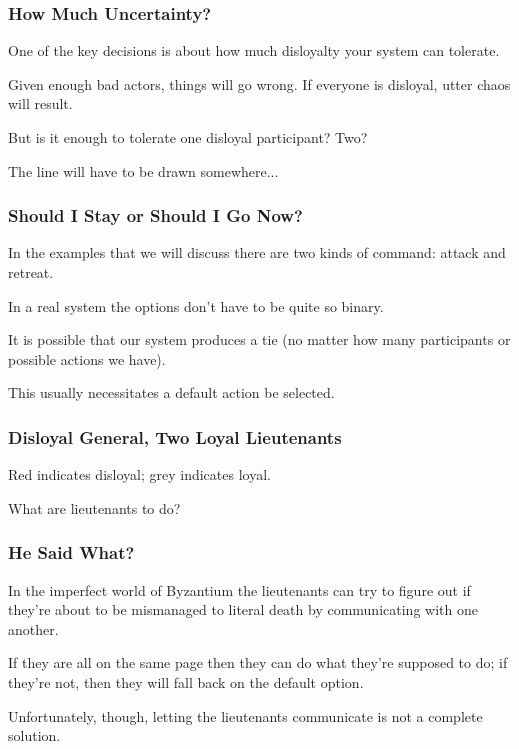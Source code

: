 \begin{frame}
	\frametitle{How Much Uncertainty?}

	One of the key decisions is about how much disloyalty your system can tolerate.

	Given enough bad actors, things will go wrong. If everyone is disloyal, utter chaos will result.

	But is it enough to tolerate one disloyal participant? Two?

	The line will have to be drawn somewhere...

\end{frame}

\begin{frame}
	\frametitle{Should I Stay or Should I Go Now?}

	In the examples that we will discuss there are two kinds of command: attack and retreat.

	In a real system the options don't have to be quite so binary.

	It is possible that our system produces a tie (no matter how many participants or possible actions we have).

	This usually necessitates a default action be selected.

\end{frame}



\begin{frame}
	\frametitle{Disloyal General, Two Loyal Lieutenants}

	\begin{center}
	\end{center}

	Red indicates disloyal; grey indicates loyal.

	What are lieutenants to do?

\end{frame}


\begin{frame}
	\frametitle{He Said What?}

	In the imperfect world of Byzantium the lieutenants can try to figure out if they're about to be mismanaged to literal death by communicating with one another.

	If they are all on the same page then they can do what they're supposed to do; if they're not, then they will fall back on the default option.

	Unfortunately, though, letting the lieutenants communicate is not a complete solution.

\end{frame}


